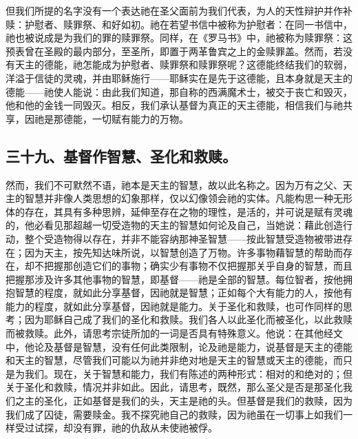 但我们所提的名字没有一个表达祂在圣父面前为我们代表，为人的天性辩护并作补赎：护慰者、赎罪祭、和好如初。祂在若望书信中被称为护慰者：在同一书信中，祂也被说成是为我们的罪的赎罪祭。同样，在《罗马书》中，祂被称为赎罪祭：这预表曾在圣殿的最内部分，至圣所，即置于两革鲁宾之上的金赎罪盖。然而，若没有天主的德能，祂怎能成为护慰者、赎罪祭和赎罪祭呢？这德能终结我们的软弱，洋溢于信徒的灵魂，并由耶稣施行——耶稣实在是先于这德能，且本身就是天主的德能——祂使人能说：由此我们知道，那自称的西满魔术士，被交于丧亡和毁灭，他和他的金钱一同毁灭。相反，我们承认基督为真正的天主德能，相信我们与祂共享，因祂是那德能，一切赋有能力的万物。\par


\subsection{三十九、基督作智慧、圣化和救赎。}

然而，我们不可默然不语，祂本是天主的智慧，故以此名称之。因为万有之父、天主的智慧并非像人类思想的幻象那样，仅以幻像领会祂的实体。凡能构思一种无形体的存在，其具有多种思辨，延伸至存在之物的理性，是活的，并可说是赋有灵魂的，他必看见那超越一切受造物的天主的智慧如何论及自己，当她说：藉此创造行动，整个受造物得以存在，并非不能容纳那神圣智慧——按此智慧受造物被带进存在；因为天主，按先知达味所说，以智慧创造了万物。许多事物藉智慧的帮助而存在，却不把握那创造它们的事物；确实少有事物不仅把握那关乎自身的智慧，而且把握那涉及许多其他事物的智慧，即基督——祂是全部的智慧。每位智者，按他拥抱智慧的程度，就如此分享基督，因祂就是智慧；正如每个大有能力的人，按他有能力的程度，就如此分享基督，因祂就是能力。关于圣化和救赎，也可作同样的思考；因为耶稣自己成了我们的圣化和救赎。我们各人以此圣化而被圣化，以此救赎而被救赎。此外，请思考宗徒所加的一词是否具有特殊意义。他说：在其他经文中，他论及基督是智慧，没有任何此类限制，论及祂是能力，说基督是天主的德能和天主的智慧，尽管我们可能以为祂并非绝对地是天主的智慧或天主的德能，而只是为我们。现在，关于智慧和能力，我们有陈述的两种形式：相对的和绝对的；但关于圣化和救赎，情况并非如此。因此，请思考，既然，那么圣父是否是那圣化我们之主的圣化，正如基督是我们的头，天主是祂的头。但基督是我们的救赎，因为我们成了囚徒，需要赎金。我不探究祂自己的救赎，因为祂虽在一切事上如我们一样受过试探，却没有罪，祂的仇敌从未使祂被俘。\par

